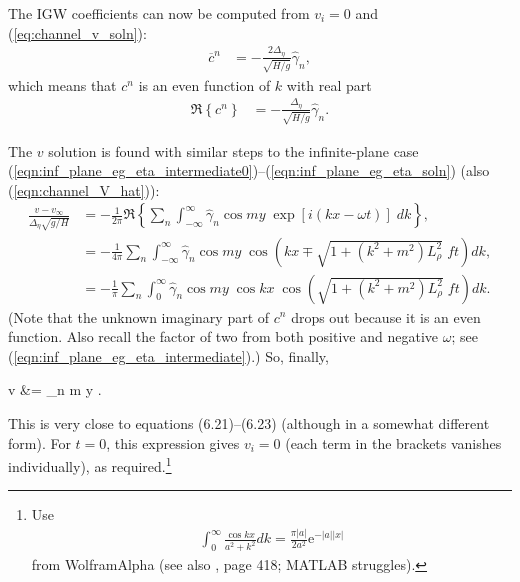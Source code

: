 \documentclass[10pt,reqno]{amsart}
\newcommand{\expe}{{\mathrm e}}
\begin{document}
The IGW coefficients can now be computed from $v_i = 0 $ and (\ref{eq:channel_v_soln}):
\begin{align}
\overline{c}^n & = - \frac{2 \Delta_\eta} {\sqrt{H/g}} \hat{\gamma}_n ,
\end{align}
which means that $c^n$ is an even function of $k$ with real part
\begin{align}
\Re \left\{ c^n \right\} & = - \frac{\Delta_\eta} {\sqrt{H/g}} \hat{\gamma}_n .
\label{eqn:channel_example_IGW_coeffs}
\end{align}

The $v$ solution is found with similar steps to the infinite-plane case (\ref{eqn:inf_plane_eg_eta_intermediate0})--(\ref{eqn:inf_plane_eg_eta_soln}) (also (\ref{eqn:channel_V_hat})):
\begin{align}
\frac{v - v_\infty}{\Delta_\eta \sqrt{g/H}}  &= -\frac{1}{2 \pi}\Re \left\{ \sum_n \int_{-\infty} ^{\infty} \hat{\gamma}_n \cos m y \; \exp \left[ i \left(k x - \omega t\right) \right] \; dk  \right\} , \nonumber \\
&= -\frac{1}{4 \pi} \sum_n \int_{-\infty} ^{\infty} \hat{\gamma}_n \cos m y \; \cos \left(k x \mp \sqrt{1 + \left( k^2 + m^2\right) L_\rho^2 } \; f t\right)  dk  , \nonumber \\
&= -\frac{1}{ \pi} \sum_n \int_{0} ^{\infty} \hat{\gamma}_n \cos m y \; \cos k x\; \cos \left( \sqrt{1 + \left( k^2 + m^2\right) L_\rho^2 } \; f t\right)  dk  .
\end{align}
(Note that the unknown imaginary part of $c^n$ drops out because it is an even function. Also recall the factor of two from both positive and negative $\omega$; see (\ref{eqn:inf_plane_eg_eta_intermediate}).)
So, finally, 
\begin{mymathbox}[ams align, title=Infinite Channel Adjustment Example $v$ Solution, colframe=black!30!black]
 v &= \sum_n  \cos m y  .
\label{eqn:channel_eg_v_soln}
\end{mymathbox}
This is very close to \citet{gill76} equations (6.21)--(6.23) (although in a somewhat different form).
For $t=0$, this expression gives $v_i=0$ (each term in the brackets vanishes individually), as required.\footnote{Use 
\begin{align}
\int_{0} ^{\infty} \frac{\cos k x }{a^2 + k^2 }  dk = \frac{\pi |a|}{2 a^2} \expe ^{- |a| |x|}
\end{align}
from WolframAlpha (see also \citealt{gradshteyn&ryzhik00}, page 418; MATLAB struggles).
}
\end{document}
